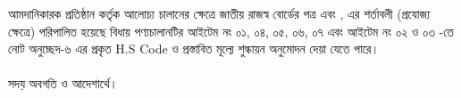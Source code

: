 \documentclass[12pt]{article}
\begin{document}
\begin{minipage}[t]{0.95\linewidth}
আমদানিকারক প্রতিষ্ঠান কর্তৃক আলোচ্য চালানের
ক্ষেত্রে জাতীয় রাজস্ব বোর্ডের পত্র এবং
{\srooof}, {\srooofd}
এর শর্তাবলী (প্রযোজ্য ক্ষেত্রে) পরিপালিত হয়েছে
বিধায় পণ্যচালানটির আইটেম নং ০১, ০৪, ০৫, ০৬, ০৭
{\cpcfzn} এবং আইটেম নং ০২ ও ০৩ {\cpcsso}-তে নোট অনুচ্ছেদ-৬ এর প্রকৃত H.S Code
ও প্রস্তাবিত মূল্যে শুল্কায়ন অনুমোদন দেয়া যেতে পারে।
\\
\\
সদয় অবগতি ও আদেশার্থে।
\end{minipage}
\thispagestyle{laststyle}
\end{document}
